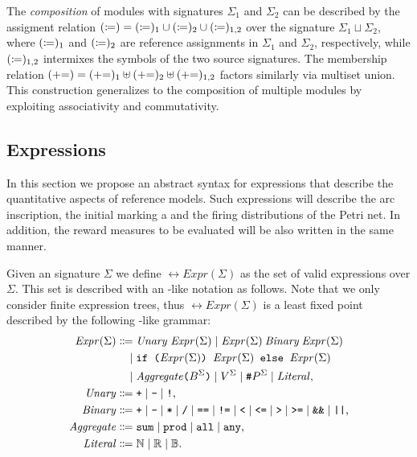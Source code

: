 The \emph{composition} of  modules with signatures \(\Sigma_1\) and \(\Sigma_2\) can be described by the assigment relation \((\coloneq) = (\coloneq)_1 \cup (\coloneq)_2 \cup (\coloneq)_{1,2}\) over the signature \(\Sigma_1 \sqcup \Sigma_2\), where \((\coloneq)_1\) and \((\coloneq)_2\) are reference assignments in \(\Sigma_1\) and \(\Sigma_2\), respectively, while \((\coloneq)_{1,2}\) intermixes the symbols of the two source signatures. The membership relation \((\mathrel{{+}{=}}) = (\mathrel{{+}{=}})_1 \uplus (\mathrel{{+}{=}})_2 \uplus (\mathrel{{+}{=}})_{1,2}\) factors similarly via multiset union. This construction generalizes to the composition of multiple modules by exploiting associativity and commutativity.

\subsection{Expressions}

In this section we propose an abstract syntax for expressions that describe the quantitative aspects of reference  models. Such expressions will describe the arc inscription, the initial marking a and the firing distributions of the Petri net. In addition, the reward measures to be evaluated will be also written in the same manner.

Given an  signature \(\Sigma\) we define \(\rel{Expr}(\Sigma)\) as the set of valid expressions over \(\Sigma\). This set is described with an -like notation as follows. Note that we only consider finite expression trees, thus \(\rel{Expr}(\Sigma)\) is a least fixed point described by the following -like grammar:
\begin{equation}
  \label{eq:rgspn:expression}
  \begin{aligned}
    \ebnfV{\rel{Expr}(\Sigma)} &\ebnfEq \ebnfVar{Unary}\; \ebnfV{\rel{Expr}(\Sigma)}
    \mid \ebnfV{\rel{Expr}(\Sigma)} \mathbin{\ebnfVar{Binary}} \ebnfV{\rel{Expr}(\Sigma)} \\*
    &\ebnfCont \lit{if (\ebnfV{\rel{Expr}(\Sigma)}) \ebnfV{\rel{Expr}(\Sigma)} else \ebnfV{\rel{Expr}(\Sigma)}} \\*
    &\ebnfCont \ebnfVar{Aggregate} \lit{(} \ebnfV{B^\Sigma} \lit{)} \mid
      \ebnfV{V^\Sigma} \mid \lit{\#} \ebnfV{P^\Sigma} 
      \mid \ebnfVar{Literal} \text, \\
    \ebnfVar{Unary} &\ebnfEq \lit{+} \mid \lit{-} \mid \lit{!} \text, \\
    \ebnfVar{Binary} &\ebnfEq \lit{+} \mid \lit{-} \mid \lit{*} \mid \lit{/}
    \mid \lit{==} \mid \lit{!=} \mid \lit{<} \mid \lit{<=} \mid \lit{>} \mid \lit{>=}
    \mid \lit{\&\&} \mid \lit{||} \text, \\
    \ebnfVar{Aggregate} &\ebnfEq \lit{sum} \mid \lit{prod}
    \mid \lit{all} \mid \lit{any} \text, \\
    \ebnfVar{Literal} &\ebnfEq \ebnfV{\NN} \mid \ebnfV{\RR} \mid \ebnfV{\BB} \text.
  \end{aligned}
\end{equation}

